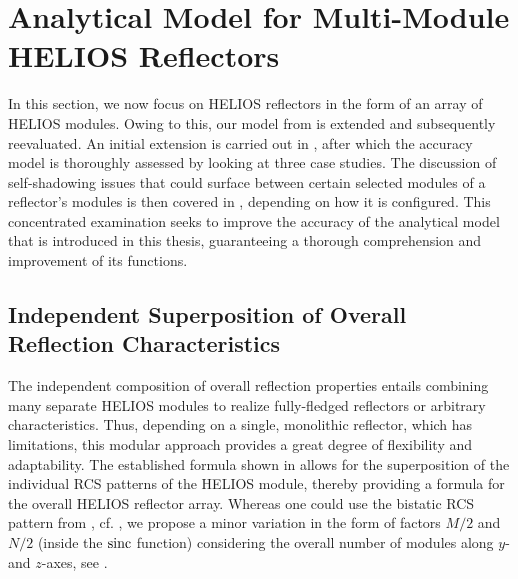 \section{Analytical Model for Multi-Module HELIOS Reflectors} \label{Simulation and Modeling of HELIOS Reflectors}
In this section, we now focus on HELIOS reflectors in the form of an array of HELIOS modules. Owing to this, our model from  is extended and subsequently reevaluated. An initial extension is carried out in , after which the accuracy model is thoroughly assessed by looking at three case studies. The discussion of self-shadowing issues that could surface between certain selected modules of a reflector's modules is then covered in , depending on how it is configured. This concentrated examination seeks to improve the accuracy of the analytical model that is introduced in this thesis, guaranteeing a thorough comprehension and improvement of its functions.
\subsection{Independent Superposition of Overall Reflection Characteristics} \label{Independent Composition of Overall Reflection Characteristics}
The independent composition of overall reflection properties entails combining many separate HELIOS modules to realize fully-fledged reflectors or arbitrary characteristics. Thus, depending on a single, monolithic reflector, which has limitations, this modular approach provides a great degree of flexibility and adaptability. The established formula shown in  allows for the superposition of the individual RCS patterns of the HELIOS module, thereby providing a formula for the overall HELIOS reflector array. Whereas one could use the bistatic RCS pattern from , cf. , we propose a minor variation in the form of factors $M/2$ and $N/2$ (inside the $\operatorname{sinc}$ function) considering the overall number of modules along $y$- and $z$-axes, see .

